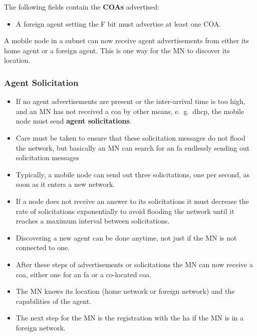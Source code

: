 The following fields contain the \textbf{COAs} advertised:
\begin{itemize}
\item A foreign agent setting the F bit must advertise at least one COA.
\end{itemize}

A mobile node in a subnet can now receive agent advertisements from either its home agent or a foreign agent. This is one way for the MN to discover its location.

\subsubsection{Agent Solicitation}
\begin{itemize}
\item If no agent advertisements are present or the inter-arrival time is too high, and an MN has not received a \gls{coa} by other means, e.\ g.\, \gls{dhcp}, the mobile node must send \textbf{agent solicitations}. 

\item Care must be taken to ensure that these solicitation messages do not flood the network, but basically an MN can search for an \gls{fa} endlessly sending out solicitation messages

\item Typically, a mobile node can send out three solicitations, one per second, as soon as it enters a new network.

\item If a node does not receive an answer to its solicitations it must decrease the rate of solicitations exponentially to avoid flooding the network until it reaches a maximum interval between solicitations.


\item Discovering a new agent can be done anytime, not just if the MN is not connected to one.

\item After these steps of advertisements or solicitations the MN can now receive a \gls{coa}, either one for an \gls{fa} or a co-located \gls{coa}. 

\item The MN knows its location (home network or foreign network) and the capabilities of the agent.

\item The next step for the MN is the registration with the \gls{ha} if the MN is in a foreign network.
\end{itemize}



